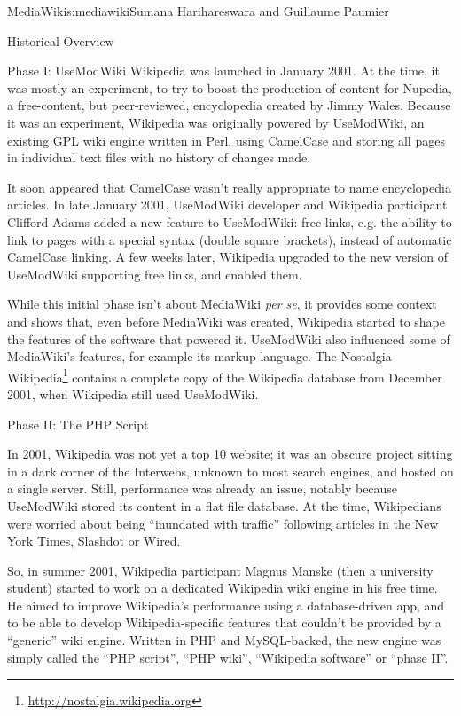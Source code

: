 \begin{aosachapter}{MediaWiki}{s:mediawiki}{Sumana Harihareswara and Guillaume Paumier}
\begin{aosasect1}{Historical Overview}
\begin{aosasect2}{Phase I: UseModWiki}
Wikipedia was launched in January 2001. At the time, it was mostly an
experiment, to try to boost the production of content for Nupedia, a
free-content, but peer-reviewed, encyclopedia created by Jimmy
Wales. Because it was an experiment, Wikipedia was originally powered
by UseModWiki, an existing GPL wiki engine written in Perl, using
CamelCase and storing all pages in individual text files with no
history of changes made.

It soon appeared that CamelCase wasn't really appropriate to name
encyclopedia articles. In late January 2001, UseModWiki developer and
Wikipedia participant Clifford Adams added a new feature to
UseModWiki: free links, e.g. the ability to link to pages with a
special syntax (double square brackets), instead of automatic
CamelCase linking. A few weeks later, Wikipedia upgraded to the new
version of UseModWiki supporting free links, and enabled them.

While this initial phase isn't about MediaWiki \emph{per se}, it
provides some context and shows that, even before MediaWiki was
created, Wikipedia started to shape the features of the software that
powered it. UseModWiki also influenced some of MediaWiki's features,
for example its markup language. The Nostalgia
Wikipedia\footnote{\url{http://nostalgia.wikipedia.org}} contains a
complete copy of the Wikipedia database from December 2001, when
Wikipedia still used UseModWiki.

\end{aosasect2}

\begin{aosasect2}{Phase II: The PHP Script}

In 2001, Wikipedia was not yet a top 10 website; it was an obscure
project sitting in a dark corner of the Interwebs, unknown to most
search engines, and hosted on a single server. Still, performance was
already an issue, notably because UseModWiki stored its content in a
flat file database. At the time, Wikipedians were worried about being
``inundated with traffic'' following articles in the New York Times,
Slashdot or Wired.

So, in summer 2001, Wikipedia participant Magnus Manske (then a
university student) started to work on a dedicated Wikipedia wiki
engine in his free time. He aimed to improve Wikipedia's performance
using a database-driven app, and to be able to develop
Wikipedia-specific features that couldn't be provided by a ``generic''
wiki engine. Written in PHP and MySQL-backed, the new engine was
simply called the ``PHP script'', ``PHP wiki'', ``Wikipedia software'' or
``phase II''.


\end{aosasect2}
\end{aosasect1}
\end{aosachapter}

